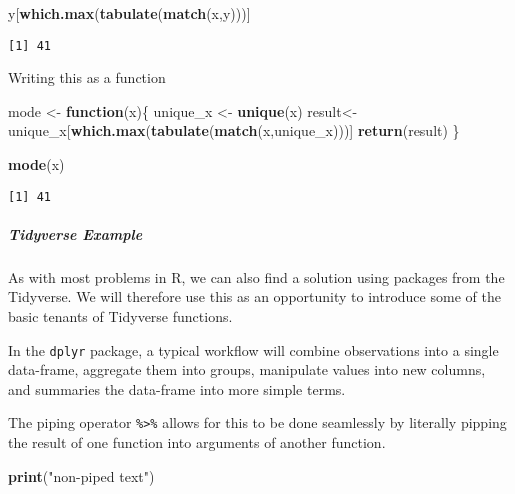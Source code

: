 \documentclass[12pt,]{article}
\newenvironment{Shaded}{\begin{snugshade}}{\end{snugshade}}
\newcommand{\KeywordTok}[1]{\textcolor[rgb]{0.13,0.29,0.53}{\textbf{#1}}}
\newcommand{\StringTok}[1]{\textcolor[rgb]{0.31,0.60,0.02}{#1}}
\newcommand{\ControlFlowTok}[1]{\textcolor[rgb]{0.13,0.29,0.53}{\textbf{#1}}}
\newcommand{\NormalTok}[1]{#1}
\let\oldsubparagraph\subparagraph
\renewcommand{\subparagraph}[1]{\oldsubparagraph{#1}\mbox{}}
\theoremstyle{definition}
\theoremstyle{definition}
\theoremstyle{definition}
\theoremstyle{remark}
\begin{document}
\begin{Shaded}
\begin{Highlighting}[]
\NormalTok{y[}\KeywordTok{which.max}\NormalTok{(}\KeywordTok{tabulate}\NormalTok{(}\KeywordTok{match}\NormalTok{(x,y)))]}
\end{Highlighting}
\end{Shaded}

\begin{verbatim}
[1] 41
\end{verbatim}

Writing this as a function

\begin{Shaded}
\begin{Highlighting}[]
\NormalTok{mode <-}\StringTok{ }\ControlFlowTok{function}\NormalTok{(x)\{}
\NormalTok{  unique_x <-}\StringTok{ }\KeywordTok{unique}\NormalTok{(x)}
\NormalTok{  result<-unique_x[}\KeywordTok{which.max}\NormalTok{(}\KeywordTok{tabulate}\NormalTok{(}\KeywordTok{match}\NormalTok{(x,unique_x)))]}
  \KeywordTok{return}\NormalTok{(result)}
\NormalTok{\}}

\KeywordTok{mode}\NormalTok{(x)}
\end{Highlighting}
\end{Shaded}

\begin{verbatim}
[1] 41
\end{verbatim}

\subparagraph{Tidyverse Example}\label{tidyverse-example}

As with most problems in R, we can also find a solution using packages
from the Tidyverse. We will therefore use this as an opportunity to
introduce some of the basic tenants of Tidyverse functions.

In the \texttt{dplyr} package, a typical workflow will combine
observations into a single data-frame, aggregate them into groups,
manipulate values into new columns, and summaries the data-frame into
more simple terms.

The piping operator \texttt{\%\textgreater{}\%} allows for this to be
done seamlessly by literally pipping the result of one function into
arguments of another function.

\begin{Shaded}
\begin{Highlighting}[]
\KeywordTok{print}\NormalTok{(}\StringTok{"non-piped text"}\NormalTok{)}
\end{Highlighting}
\end{Shaded}
\end{document}

